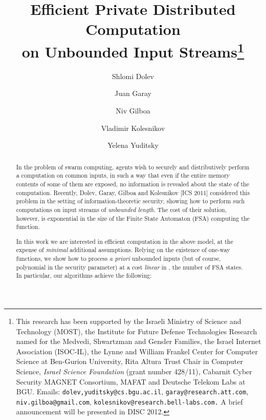\documentclass[letterpaper,11pt]{article}
\begin{document}
\begin{titlepage}

\title{\bf Efficient Private Distributed Computation \\
on Unbounded Input Streams\thanks{This research has been supported by the Israeli Ministry of Science and Technology (MOST), the Institute for Future Defense Technologies Research named for the Medvedi, Shwartzman and Gensler Families, the Israel Internet Association (ISOC-IL), the Lynne and William Frankel Center for Computer Science at Ben-Gurion University, Rita Altura Trust Chair in Computer Science, {\em Israel Science Foundation} (grant number 428/11), Cabarnit Cyber Security MAGNET Consortium, MAFAT and Deutsche Telekom Labs at BGU. Emails: {\tt {dolev,yuditsky}\allowbreak @cs.bgu.ac.il}, {\tt garay@\allowbreak research.\allowbreak att.com}, {\tt niv.gilboa@gmail.com}, {\tt kolesnikov@\allowbreak research.bell-labs.com.} A brief announcement will be presented in DISC 2012.}}

\author[1]{Shlomi Dolev}
\author[2]{Juan Garay}
\author[3]{Niv Gilboa}
\author[4]{Vladimir Kolesnikov}
\author[1]{Yelena Yuditsky}





\date{}


\maketitle
\thispagestyle{empty}
\begin{abstract}
In the problem of swarm computing,  agents wish to securely and
distributively perform a computation on common inputs, in such a way
that even if the entire memory contents of some of them are exposed,
no information is revealed about the state of the computation.
Recently, Dolev, Garay, Gilboa and Kolesnikov [ICS 2011] considered this
problem in the setting of information-theoretic security, showing how to perform such computations on input streams of {\em unbounded length}.  The cost of their solution, however, is exponential in the size of the Finite State Automaton (FSA) computing the function.

In this work we are interested in efficient computation in the above
model, at the expense of {\em minimal} additional assumptions. Relying on the existence of one-way functions, we show how to process {\it a priori} unbounded inputs (but of course, polynomial in the security parameter) at a cost {\em linear} in , the number of FSA states. In particular, our algorithms
achieve the following: 


\end{abstract}
\end{titlepage}
\end{document}
